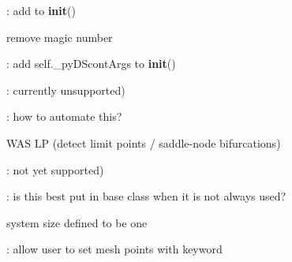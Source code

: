 
\begin{DoxyRefList}
\item[\label{todo__todo000039}%
\Hypertarget{todo__todo000039}%
Global \hyperlink{class_mu_mo_t_1_1_mu_mo_tbifurcation_view_a797e92fe19ce2636a49bf1400a69fc49}{Mu\+Mo\+Tbifurcation\+View.\+\_\+py\+D\+Scont} ]\+: add to {\bfseries init}() 

remove magic number  
\item[\label{todo__todo000033}%
\Hypertarget{todo__todo000033}%
Global \hyperlink{class_mu_mo_t_1_1_mu_mo_tbifurcation_view_aa56e2cffc879be68fdec55f29334415c}{Mu\+Mo\+Tbifurcation\+View.\+\_\+py\+D\+Scont\+Args} ]\+: add self.\+\_\+py\+D\+Scont\+Args to {\bfseries init}()  
\item[\label{todo__todo000032}%
\Hypertarget{todo__todo000032}%
Global \hyperlink{class_mu_mo_t_1_1_mu_mo_tbifurcation_view_a9d3705d1d9182e10751ff693573d6d16}{Mu\+Mo\+Tbifurcation\+View.\+\_\+state\+Variable2} ]\+: currently unsupported)  
\item[\label{todo__todo000034}%
\Hypertarget{todo__todo000034}%
Global \hyperlink{class_mu_mo_t_1_1_mu_mo_tbifurcation_view_a0a7557ffe670b6a318afa8bd9851d2fc}{Mu\+Mo\+Tbifurcation\+View.Max\+Step\+Size} ]\+: how to automate this?  
\item[\label{todo__todo000035}%
\Hypertarget{todo__todo000035}%
Global \hyperlink{class_mu_mo_t_1_1_mu_mo_tbifurcation_view_a040a7ecbcbaca807aeaec6d5c81801d5}{Mu\+Mo\+Tbifurcation\+View.Save\+Eigen} ]W\+AS \textquotesingle{}LP\textquotesingle{} (detect limit points / saddle-\/node bifurcations)  
\item[\label{todo__todo000036}%
\Hypertarget{todo__todo000036}%
Global \hyperlink{class_mu_mo_t_1_1_mu_mo_tbifurcation_view_afcc7a4b78ecd8fa7e713f8cfa0f51017}{Mu\+Mo\+Tbifurcation\+View.value} ]\+: not yet supported)  
\item[\label{todo__todo000019}%
\Hypertarget{todo__todo000019}%
Global \hyperlink{class_mu_mo_t_1_1_mu_mo_tcontroller_a018864aa22d2adb0d3958fb0adbce8e2}{Mu\+Mo\+Tcontroller.\+\_\+progress\+Bar} ]\+: is this best put in base class when it is not always used?  
\item[\label{todo__todo000026}%
\Hypertarget{todo__todo000026}%
Global \hyperlink{class_mu_mo_t_1_1_mu_mo_tfield_view_a0f5fba57766067c941f5a96b22545ed4}{Mu\+Mo\+Tfield\+View.\+\_\+\+Xdot} ]system size defined to be one 

\+: allow user to set mesh points with keyword 


\end{DoxyRefList}
